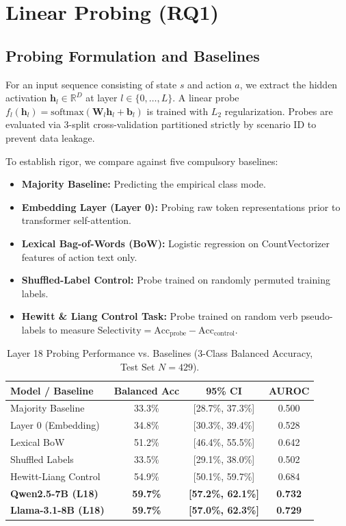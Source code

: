 \documentclass[10pt,twocolumn,letterpaper]{article}
\begin{document}
\section{Linear Probing (RQ1)}

\subsection{Probing Formulation and Baselines}
For an input sequence consisting of state $s$ and action $a$, we extract the hidden activation $\mathbf{h}_l \in \mathbb{R}^D$ at layer $l \in \{0, \dots, L\}$. A linear probe $f_l(\mathbf{h}_l) = \text{softmax}(\mathbf{W}_l \mathbf{h}_l + \mathbf{b}_l)$ is trained with $L_2$ regularization. Probes are evaluated via 3-split cross-validation partitioned strictly by scenario ID to prevent data leakage.

To establish rigor, we compare against five compulsory baselines:
\begin{itemize}
    \item \textbf{Majority Baseline:} Predicting the empirical class mode.
    \item \textbf{Embedding Layer (Layer 0):} Probing raw token representations prior to transformer self-attention.
    \item \textbf{Lexical Bag-of-Words (BoW):} Logistic regression on CountVectorizer features of action text only.
    \item \textbf{Shuffled-Label Control:} Probe trained on randomly permuted training labels.
    \item \textbf{Hewitt \& Liang Control Task:} Probe trained on random verb pseudo-labels to measure $\text{Selectivity} = \text{Acc}_{\text{probe}} - \text{Acc}_{\text{control}}$.
\end{itemize}

\begin{table}[t]
\centering
\small
\caption{Layer 18 Probing Performance vs. Baselines (3-Class Balanced Accuracy, Test Set $N=429$).}
\begin{tabular}{lccc}
\toprule
Model / Baseline & Balanced Acc & 95\% CI & AUROC \\
\midrule
Majority Baseline & 33.3\% & [28.7\%, 37.3\%] & 0.500 \\
Layer 0 (Embedding) & 34.8\% & [30.3\%, 39.4\%] & 0.528 \\
Lexical BoW & 51.2\% & [46.4\%, 55.5\%] & 0.642 \\
Shuffled Labels & 33.5\% & [29.1\%, 38.0\%] & 0.502 \\
Hewitt-Liang Control & 54.9\% & [50.1\%, 59.7\%] & 0.684 \\
\midrule
\textbf{Qwen2.5-7B (L18)} & \textbf{59.7\%} & \textbf{[57.2\%, 62.1\%]} & \textbf{0.732} \\
\textbf{Llama-3.1-8B (L18)} & \textbf{59.7\%} & \textbf{[57.0\%, 62.3\%]} & \textbf{0.729} \\
\bottomrule
\end{tabular}
\label{tab:probing}
\end{table}
\end{document}
